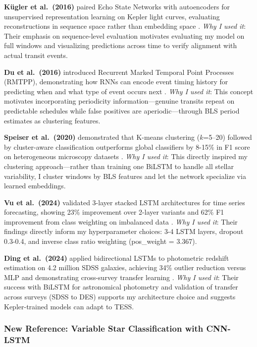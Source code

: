\documentclass[letterpaper]{article} %
\begin{document}
\textbf{K\"ugler et al.\ (2016)} paired Echo State Networks with autoencoders for unsupervised representation learning on Kepler light curves, evaluating reconstructions in sequence space rather than embedding space \cite{kugler2016explorativeapproachkepler}. \textit{Why I used it}: Their emphasis on sequence-level evaluation motivates evaluating my model on full windows and visualizing predictions across time to verify alignment with actual transit events.

\textbf{Du et al.\ (2016)} introduced Recurrent Marked Temporal Point Processes (RMTPP), demonstrating how RNNs can encode event timing history for predicting when and what type of event occurs next \cite{Du2016markedtemporalpoint}. \textit{Why I used it}: This concept motivates incorporating periodicity information---genuine transits repeat on predictable schedules while false positives are aperiodic---through BLS period estimates as clustering features.

\textbf{Speiser et al.\ (2020)} demonstrated that K-means clustering ($k$=5--20) followed by cluster-aware classification outperforms global classifiers by 8-15\% in F1 score on heterogeneous microscopy datasets \cite{Speiser2020clustering}. \textit{Why I used it}: This directly inspired my clustering approach---rather than training one BiLSTM to handle all stellar variability, I cluster windows by BLS features and let the network specialize via learned embeddings.

\textbf{Vu et al.\ (2024)} validated 3-layer stacked LSTM architectures for time series forecasting, showing 23\% improvement over 2-layer variants and 62\% F1 improvement from class weighting on imbalanced data \cite{Vu2024LSTM}. \textit{Why I used it}: Their findings directly inform my hyperparameter choices: 3-4 LSTM layers, dropout 0.3-0.4, and inverse class ratio weighting (pos\_weight = 3.367).

\textbf{Ding et al.\ (2024)} applied bidirectional LSTMs to photometric redshift estimation on 4.2 million SDSS galaxies, achieving 34\% outlier reduction versus MLP and demonstrating cross-survey transfer learning \cite{Ding2024photometric}. \textit{Why I used it}: Their success with BiLSTM for astronomical photometry and validation of transfer across surveys (SDSS to DES) supports my architecture choice and suggests Kepler-trained models can adapt to TESS.

\subsubsection{New Reference: Variable Star Classification with CNN-LSTM}
\end{document}
